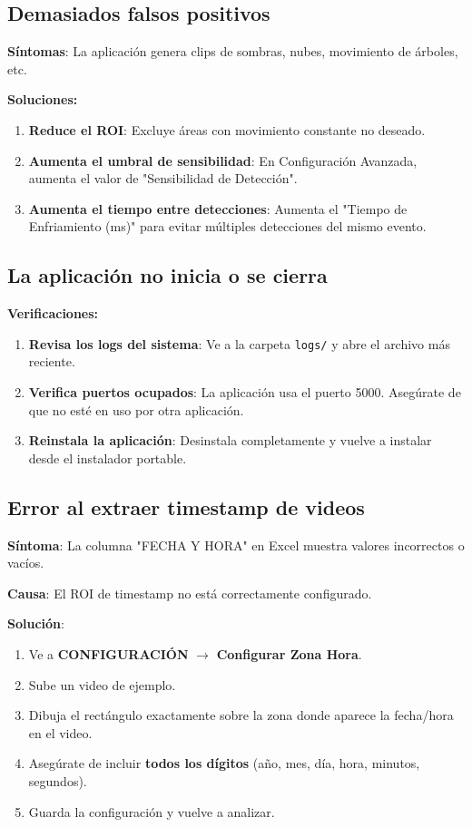 \documentclass[11pt,a4paper]{article}
\begin{document}
\subsection{Demasiados falsos positivos}

\textbf{Síntomas}: La aplicación genera clips de sombras, nubes, movimiento de árboles, etc.

\textbf{Soluciones:}
\begin{enumerate}
    \item \textbf{Reduce el ROI}: Excluye áreas con movimiento constante no deseado.
    \item \textbf{Aumenta el umbral de sensibilidad}: En Configuración Avanzada, aumenta el valor de "Sensibilidad de Detección".
    \item \textbf{Aumenta el tiempo entre detecciones}: Aumenta el "Tiempo de Enfriamiento (ms)" para evitar múltiples detecciones del mismo evento.
\end{enumerate}

\subsection{La aplicación no inicia o se cierra}

\textbf{Verificaciones:}
\begin{enumerate}
    \item \textbf{Revisa los logs del sistema}: Ve a la carpeta \texttt{logs/} y abre el archivo más reciente.
    \item \textbf{Verifica puertos ocupados}: La aplicación usa el puerto 5000. Asegúrate de que no esté en uso por otra aplicación.
    \item \textbf{Reinstala la aplicación}: Desinstala completamente y vuelve a instalar desde el instalador portable.
\end{enumerate}

\subsection{Error al extraer timestamp de videos}

\textbf{Síntoma}: La columna "FECHA Y HORA" en Excel muestra valores incorrectos o vacíos.

\textbf{Causa}: El ROI de timestamp no está correctamente configurado.

\textbf{Solución}:
\begin{enumerate}
    \item Ve a \textbf{CONFIGURACIÓN} $\rightarrow$ \textbf{Configurar Zona Hora}.
    \item Sube un video de ejemplo.
    \item Dibuja el rectángulo exactamente sobre la zona donde aparece la fecha/hora en el video.
    \item Asegúrate de incluir \textbf{todos los dígitos} (año, mes, día, hora, minutos, segundos).
    \item Guarda la configuración y vuelve a analizar.
\end{enumerate}
\end{document}
